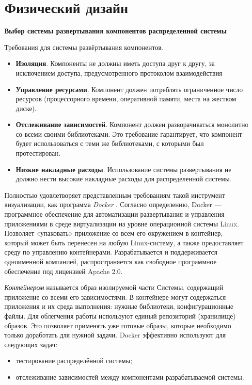 \pagebreak

\section*{Физический дизайн}

\textbf{Выбор системы развертывания компонентов распределенной системы}


Требования для системы развёртывания компонентов.
\begin{itemize}
	\item \textbf{Изоляция}. Компоненты не  должны  иметь  доступа друг к другу, за исключением доступа, предусмотренного протоколом взаимодействия
	
	\item \textbf{Управление  ресурсами}. Компонент должен  потреблять  ограниченное  число  ресурсов  (процессорного  времени, оперативной памяти, места на жестком диске).
	
	\item \textbf{Отслеживание  зависимостей}.  Компонент  должен разворачиваться  монолитно  со  всеми  своими  библиотеками.  Это требование гарантирует, что компонент будет использоваться с теми же библиотеками, с которыми был протестирован.
	
	\item \textbf{Низкие накладные расходы}. Использование системы  развертывания не должно нести высокие накладные расходы для распределенной системы.
\end{itemize}

Полностью  удовлетворяет представленным требованиям такой инструмент  визуализации,  как  программа  \textit{Docker} \cite{bib:docker}.  Согласно определению,  Docker  —  программное  обеспечение  для  автоматизации развертывания и управления приложениями в среде виртуализации на уровне операционной системы Linux. Позволяет «упаковать» приложение со всем его окружением в контейнер, который может быть перенесен на любую Linux-систему, а также предоставляет  среду  по  управлению  контейнерами.  Разрабатывается  и  поддерживается одноименной компанией, распространяется как свободное программное обеспечение под лицензией Apache 2.0.

\textit{Контейнером}  называется  образ  изолируемой  части  Системы, содержащий приложение со всеми его зависимостями. В контейнере могут содержаться приложения и их среда выполнения: нужные библиотеки, конфигурационные файлы. Для облегчения работы используют единый репозиторий (хранилище) образов. Это позволяет применять уже готовые образы, которые необходимо только доработать для нужной задачи. Docker  эффективно используют для следующих задач:
\begin{itemize}
	\item тестирование распределённой системы;
	
	\item отслеживание зависимостей между компонентами разрабатываемой системы.
\end{itemize}

